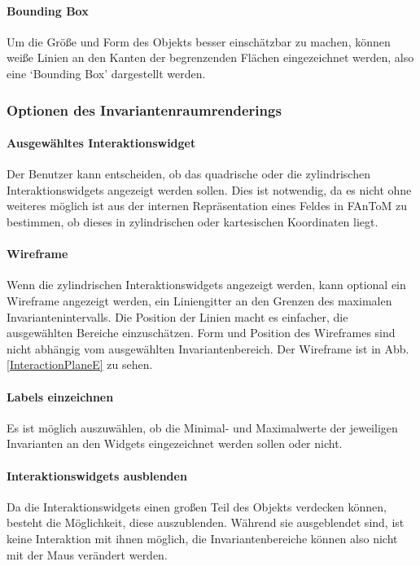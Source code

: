 \documentclass[a4paper,fontsize=12pt,toc=bib,halfparskip]{scrartcl}
\begin{document}
\paragraph{Bounding Box}
Um die Gr\"o{\ss}e und Form des Objekts besser einsch\"atzbar zu machen, k\"onnen wei{\ss}e Linien an den Kanten der begrenzenden Fl\"achen eingezeichnet werden, also eine `Bounding Box' dargestellt werden.

\subsubsection{Optionen des Invariantenraumrenderings}
\label{sec:Options}

\paragraph{Ausgew\"ahltes Interaktionswidget}
Der Benutzer kann entscheiden, ob das quadrische oder die zylindrischen Interaktionswidgets angezeigt werden sollen. Dies ist notwendig, da es nicht ohne weiteres m\"oglich ist aus der internen Repr\"asentation eines Feldes in FAnToM zu bestimmen, ob dieses in zylindrischen oder kartesischen Koordinaten liegt.

\paragraph{Wireframe}
Wenn die zylindrischen Interaktionswidgets angezeigt werden, kann optional ein Wireframe angezeigt werden, ein Liniengitter an den Grenzen des maximalen Invariantenintervalls. Die Position der Linien macht es einfacher, die ausgew\"ahlten Bereiche einzusch\"atzen. Form und Position des Wireframes sind nicht abh\"angig vom ausgew\"ahlten Invariantenbereich. Der Wireframe ist in Abb. \ref{InteractionPlaneE} zu sehen.

\paragraph{Labels einzeichnen}
Es ist m\"oglich auszuw\"ahlen, ob die Minimal- und Maximalwerte der jeweiligen Invarianten an den Widgets eingezeichnet werden sollen oder nicht.

\paragraph{Interaktionswidgets ausblenden}
Da die Interaktionswidgets einen gro{\ss}en Teil des Objekts verdecken k\"onnen, besteht die M\"oglichkeit, diese auszublenden. W\"ahrend sie ausgeblendet sind, ist keine Interaktion mit ihnen m\"oglich, die Invariantenbereiche k\"onnen also nicht mit der Maus ver\"andert werden.
\end{document}
